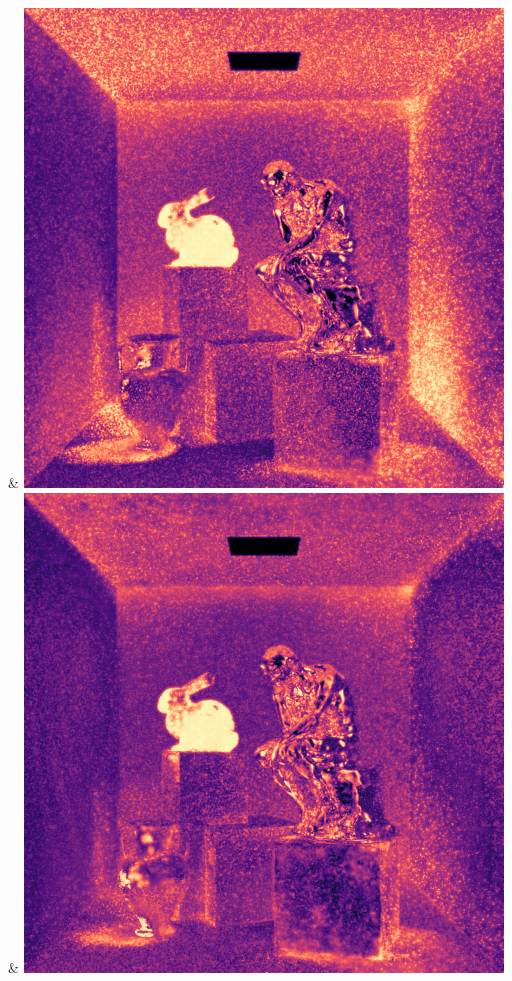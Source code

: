 & \includegraphics[width=\linewidth]{figures/py/tests/path_termination/sah+nee_1spp_thinker_flip.png}
& \includegraphics[width=\linewidth]{figures/py/tests/path_termination/bth+nee_1spp_thinker_flip.png}
